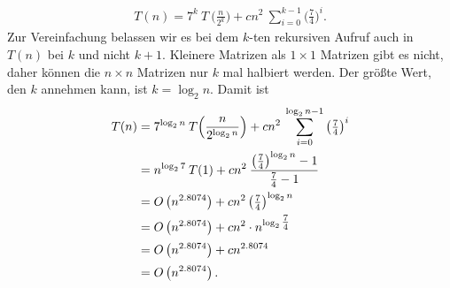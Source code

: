 \documentclass{scrartcl}
\numberwithin{equation}{section}
\begin{document}
\begin{align*}
	T(n) = 7^k \: T \: \big(\tfrac{n}{2^k}\big) + cn^2 \: \sum_{i = 0}^{k-1} \bigg(\frac{7}{4}\bigg)^i.
\end{align*}
Zur Vereinfachung belassen wir es bei dem $k$-ten rekursiven Aufruf auch in $T(n)$ bei $k$ und nicht $k + 1$. Kleinere Matrizen als $1 \times 1$ Matrizen gibt es nicht, daher können die $n \times n$ Matrizen nur $k$ mal halbiert werden. Der größte Wert, den $k$ annehmen kann, ist $k = \log_{2}n$. Damit ist
\begin{align*}
	\vphantom{\rule{0pt}{2.5ex}} T(n) &= 7^{\log_{2}n} \: T\Big(\frac{n}{2^{\log_{2}n}}\Big) + cn^2 \: \sum_{i = 0}^{\log_{2}n-1} \left(\tfrac{7}{4}\right)^i \\
	\vphantom{\rule{0pt}{2.5ex}} &= n^{\log_{2}7} \: T(1) + cn^2 \:\frac{\left(\tfrac{7}{4}\right)^{\log_{2}n} - 1}{\tfrac{7}{4} - 1} \\
	\vphantom{\rule{0pt}{2.5ex}} &= O\left(n^{2.8074}\right) + cn^2 \left(\tfrac{7}{4}\right)^{\log_{2}n} \\
	\vphantom{\rule{0pt}{2.5ex}} &= O\left(n^{2.8074}\right) + cn^2 \cdot n^{\log_{2}\tfrac{7}{4}} \\
	\vphantom{\rule{0pt}{2.5ex}} &= O\left(n^{2.8074}\right) + cn^{2.8074} \\
	\vphantom{\rule{0pt}{2.5ex}} &= O\left(n^{2.8074}\right).
\end{align*}
\end{document}
